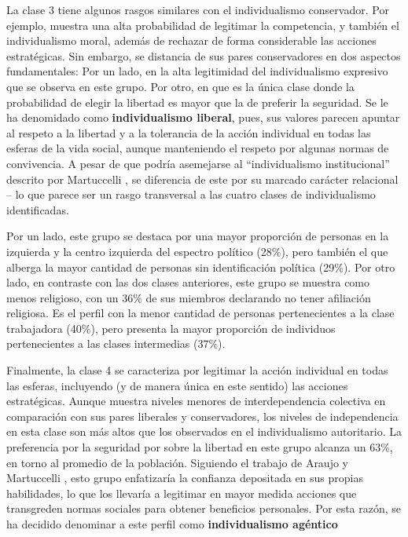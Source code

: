 \documentclass[12pt,twoside]{templates/facsothesis}
\begin{document}
La clase 3 tiene algunos rasgos similares con el individualismo conservador. Por ejemplo, muestra una alta probabilidad de legitimar la competencia, y también el individualismo moral, además de rechazar de forma considerable las acciones estratégicas. Sin embargo, se distancia de sus pares conservadores en dos aspectos fundamentales: Por un lado, en la alta legitimidad del individualismo expresivo que se observa en este grupo. Por otro, en que es la única clase donde la probabilidad de elegir la libertad es mayor que la de preferir la seguridad. Se le ha denomidado como \textbf{individualismo liberal}, pues, sus valores parecen apuntar al respeto a la libertad y a la tolerancia de la acción individual en todas las esferas de la vida social, aunque manteniendo el respeto por algunas normas de convivencia. A pesar de que podría asemejarse al ``individualismo institucional'' descrito por Martuccelli \citeyearpar{martuccelli2010}, se diferencia de este por su marcado carácter relacional -- lo que parece ser un rasgo transversal a las cuatro clases de individualismo identificadas.

Por un lado, este grupo se destaca por una mayor proporción de personas en la izquierda y la centro izquierda del espectro político (28\%), pero también el que alberga la mayor cantidad de personas sin identificación política (29\%). Por otro lado, en contraste con las dos clases anteriores, este grupo se muestra como menos religioso, con un 36\% de sus miembros declarando no tener afiliación religiosa. Es el perfil con la menor cantidad de personas pertenecientes a la clase trabajadora (40\%), pero presenta la mayor proporción de individuos pertenecientes a las clases intermedias (37\%).

Finalmente, la clase 4 se caracteriza por legitimar la acción individual en todas las esferas, incluyendo (y de manera única en este sentido) las acciones estratégicas. Aunque muestra niveles menores de interdependencia colectiva en comparación con sus pares liberales y conservadores, los niveles de independencia en esta clase son más altos que los observados en el individualismo autoritario. La preferencia por la seguridad por sobre la libertad en este grupo alcanza un 63\%, en torno al promedio de la población. Siguiendo el trabajo de Araujo y Martuccelli \citeyearpar{araujo2012}, esto grupo enfatizaría la confianza depositada en sus propias habilidades, lo que los llevaría a legitimar en mayor medida acciones que transgreden normas sociales para obtener beneficios personales. Por esta razón, se ha decidido denominar a este perfil como \textbf{individualismo agéntico}
\end{document}
